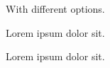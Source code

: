 \documentclass{article}
\begin{document}
{With different options.}

Lorem ipsum  dolor sit.

Lorem ipsum  dolor sit.




\end{document}
